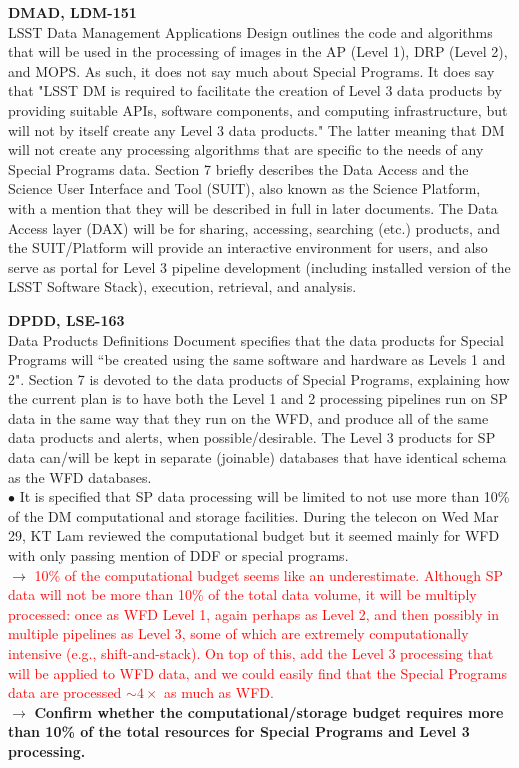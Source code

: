 \documentclass[DM,lsstdraft,toc]{lsstdoc}
\begin{document}
\noindent \textbf{DMAD, LDM-151}\\
LSST Data Management Applications Design \citep{LDM-151} outlines the code and algorithms that will be used in the processing of images in the AP (Level 1), DRP (Level 2), and MOPS. As such, it does not say much about Special Programs. It does say that "LSST DM is required to facilitate the creation of Level 3 data products by providing suitable APIs, software components, and computing infrastructure, but will not by itself create any Level 3 data products." The latter meaning that DM will not create any processing algorithms that are specific to the needs of any Special Programs data. Section 7 briefly describes the Data Access and the Science User Interface and Tool (SUIT), also known as the Science Platform, with a mention that they will be described in full in later documents. The Data Access layer (DAX) will be for sharing, accessing, searching (etc.) products, and the SUIT/Platform will provide an interactive environment for users, and also serve as portal for Level 3 pipeline development (including installed version of the LSST Software Stack), execution, retrieval, and analysis.

\noindent \textbf{DPDD, LSE-163}\\
Data Products Definitions Document \citep{LSE-163} specifies that the data products for Special Programs will ``be created using the same software and hardware as Levels 1 and 2". Section 7 is devoted to the data products of Special Programs, explaining how the current plan is to have both the Level 1 and 2 processing pipelines run on SP data in the same way that they run on the WFD, and produce all of the same data products and alerts, when possible/desirable. The Level 3 products for SP data can/will be kept in separate (joinable) databases that have identical schema as the WFD databases. \\
$\bullet$ It is specified that SP data processing will be limited to not use more than 10\% of the DM computational and storage facilities. During the telecon on Wed Mar 29, KT Lam reviewed the computational budget but it seemed mainly for WFD with only passing mention of DDF or special programs. \\
$\rightarrow$ \textcolor{red}{10\% of the computational budget seems like an underestimate. Although SP data will not be more than 10\% of the total data volume, it will be multiply processed: once as WFD Level 1, again perhaps as Level 2, and then possibly in multiple pipelines as Level 3, some of which are extremely computationally intensive (e.g., shift-and-stack). On top of this, add the Level 3 processing that will be applied to WFD data, and we could easily find that the Special Programs data are processed $\sim4\times$ as much as WFD.} \\
$\rightarrow$ \textbf{Confirm whether the computational/storage budget requires more than 10\% of the total resources for Special Programs and Level 3 processing.}
\end{document}
